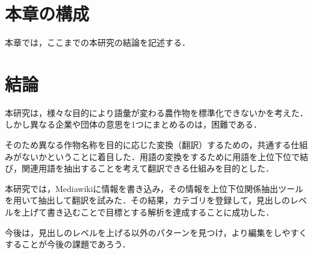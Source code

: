 \section{本章の構成}
本章では，ここまでの本研究の結論を記述する．

\section{結論}
本研究は，様々な目的により語彙が変わる農作物を標準化できないかを考えた．しかし異なる企業や団体の意思を1つにまとめるのは，困難である．

そのため異なる作物名称を目的に応じた変換（翻訳）するための，共通する仕組みがないかということに着目した．用語の変換をするために用語を上位下位で結び，関連用語を抽出することを考えて翻訳できる仕組みを目的とした．

本研究では，Mediawikiに情報を書き込み，その情報を上位下位関係抽出ツールを用いて抽出して翻訳を試みた．その結果，カテゴリを登録して，見出しのレベルを上げて書き込むことで目標とする解析を達成することに成功した．

今後は，見出しのレベルを上げる以外のパターンを見つけ，より編集をしやすくすることが今後の課題であろう．








